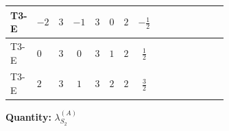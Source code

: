 \documentclass[8pt]{article}
\begin{document}
\begin{landscape}
\begin{longtable}{@{}llcccccc >{\raggedright\arraybackslash}p{0.21\linewidth} >{\raggedright\arraybackslash}p{0.21\linewidth} >{\raggedright\arraybackslash}p{0.21\linewidth}@{}}
\midrule
T3-E & $-2$ & $3$ & $-1$ & $3$ & $0$ & $2$ & $-\frac{1}{2}$ & \scriptsize\adjustbox{max width=\linewidth}{$\begin{gathered} {\lambda_{S_2}^{(1)}} \left(\frac{1}{2} T_{\nu}^{(2)}+13 {\lambda_{S_2}^{(A)}}\right)\end{gathered}$} & \scriptsize\adjustbox{max width=\linewidth}{$\begin{gathered} +4 {\lambda_{S_2}^{(A)}} T_{\nu}^{(2)}\end{gathered}$} & \scriptsize\adjustbox{max width=\linewidth}{$\begin{gathered} -\operatorname{Tr}\!\left({y_2}\,\left({y_2}\right)^{\dagger}\,{y_2}\,\left({y_2}\right)^{\dagger}\right)\end{gathered}$} \\
\midrule
T3-E & $0$ & $3$ & $0$ & $3$ & $1$ & $2$ & $\frac{1}{2}$ & \scriptsize\adjustbox{max width=\linewidth}{$\begin{gathered} {\lambda_{S_2}^{(1)}} \left(\frac{1}{2} T_{\nu}^{(2)}+13 {\lambda_{S_2}^{(A)}}\right)\end{gathered}$} & \scriptsize\adjustbox{max width=\linewidth}{$\begin{gathered} +4 {\lambda_{S_2}^{(A)}} T_{\nu}^{(2)}\end{gathered}$} & \scriptsize\adjustbox{max width=\linewidth}{$\begin{gathered} -\operatorname{Tr}\!\left({y_2}\,\left({y_2}\right)^{\dagger}\,{y_2}\,\left({y_2}\right)^{\dagger}\right)\end{gathered}$} \\
\midrule
T3-E & $2$ & $3$ & $1$ & $3$ & $2$ & $2$ & $\frac{3}{2}$ & \scriptsize\adjustbox{max width=\linewidth}{$\begin{gathered} {\lambda_{S_2}^{(1)}} \left(\frac{1}{2} T_{\nu}^{(2)}+13 {\lambda_{S_2}^{(A)}}\right)\end{gathered}$} & \scriptsize\adjustbox{max width=\linewidth}{$\begin{gathered} +4 {\lambda_{S_2}^{(A)}} T_{\nu}^{(2)}\end{gathered}$} & \scriptsize\adjustbox{max width=\linewidth}{$\begin{gathered} -\operatorname{Tr}\!\left({y_2}\,\left({y_2}\right)^{\dagger}\,{y_2}\,\left({y_2}\right)^{\dagger}\right)\end{gathered}$} \\
\midrule
\bottomrule
\end{longtable}
\clearpage
\noindent\textbf{Quantity: }$\lambda_{S_2}^{(A)}$\par\smallskip

\end{landscape}
\end{document}
